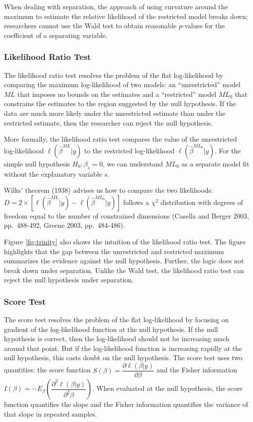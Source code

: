 \documentclass[
]{article}
\begin{document}
When dealing with separation, the approach of using curvature around the
maximum to estimate the relative likelihood of the restricted model
breaks down; researchers cannot use the Wald test to obtain reasonable
\(p\)-values for the coefficient of a separating variable.

\hypertarget{likelihood-ratio-test}{%
\subsubsection{Likelihood Ratio Test}\label{likelihood-ratio-test}}

The likelihood ratio test resolves the problem of the flat
log-likelihood by comparing the maximum log-likelihood of two models: an
``unrestricted'' model \(ML\) that imposes no bounds on the estimates
and a ``restricted'' model \(ML_0\) that constrains the estimates to the
region suggested by the null hypothesis. If the data are much more
likely under the unrestricted estimate than under the restricted
estimate, then the researcher can reject the null hypothesis.

More formally, the likelihood ratio test compares the value of the
unrestricted log-likelihood \(\ell(\hat{\beta}^{ML} | y)\) to the
restricted log-likelihood \(\ell(\hat{\beta}^{ML_0} | y)\). For the
simple null hypothesis \(H_0: \beta_s = 0\), we can understand \(ML_0\)
as a separate model fit without the explanatory variable \(s\).

Wilks' theorem (1938) advises us how to compare the two likelihoods:
\(D = 2 \times \left[ \ell(\hat{\beta}^{ML} | y) - \ell(\hat{\beta}^{ML_0} | y) \right]\)
follows a \(\chi^2\) distribution with degrees of freedom equal to the
number of constrained dimensions (Casella and Berger 2003, pp.~488-492,
Greene 2003, pp.~484-486).

Figure \ref{fig:trinity} also shows the intuition of the likelihood
ratio test. The figure highlights that the gap between the unrestricted
and restricted maximum summarizes the evidence against the null
hypothesis. Further, the logic does not break down under separation.
Unlike the Wald test, the likelihood ratio test can reject the null
hypothesis under separation.

\hypertarget{score-test}{%
\subsubsection{Score Test}\label{score-test}}

The score test resolves the problem of the flat log-likelihood by
focusing on gradient of the log-likelihood function at the null
hypothesis. If the null hypothesis is correct, then the log-likelihood
should not be increasing much around that point. But if the
log-likelihood function is increasing rapidly at the null hypothesis,
this casts doubt on the null hypothesis. The score test uses two
quantities: the score function
\(S(\beta) = \dfrac{\partial \ell(\beta | y)}{\partial \beta}\) and the
Fisher information
\(I(\beta) = -E_\beta \left( \dfrac{\partial^2 \ell(\beta | y)}{\partial^2 \beta} \right)\).
When evaluated at the null hypothesis, the score function quantifies the
slope and the Fisher information quantifies the variance of that slope
in repeated samples.
\end{document}
